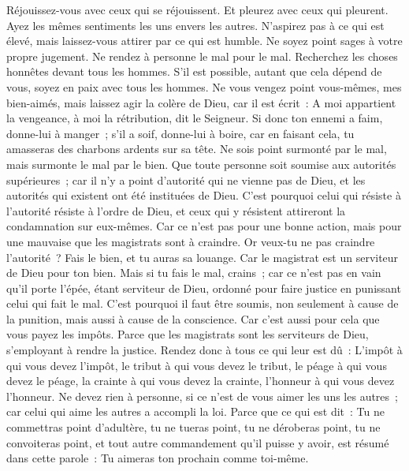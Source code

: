\begin{multicols}{2}
Réjouissez-vous avec ceux qui se réjouissent. Et pleurez avec ceux qui pleurent.
Ayez les mêmes sentiments les uns envers les autres. N'aspirez pas à ce qui est élevé, mais laissez-vous attirer par ce qui est humble. Ne soyez point sages à votre propre jugement.
Ne rendez à personne le mal pour le mal. Recherchez les choses honnêtes devant tous les hommes.
S'il est possible, autant que cela dépend de vous, soyez en paix avec tous les hommes.
Ne vous vengez point vous-mêmes, mes bien-aimés, mais laissez agir la colère de Dieu, car il est écrit~: A moi appartient la vengeance, à moi la rétribution, dit le Seigneur.
Si donc ton ennemi a faim, donne-lui à manger~; s'il a soif, donne-lui à boire, car en faisant cela, tu amasseras des charbons ardents sur sa tête.
Ne sois point surmonté par le mal, mais surmonte le mal par le bien.
\VerseOne{}Que toute personne soit soumise aux autorités supérieures~; car il n'y a point d'autorité qui ne vienne pas de Dieu, et les autorités qui existent ont été instituées de Dieu.
C'est pourquoi celui qui résiste à l'autorité résiste à l'ordre de Dieu, et ceux qui y résistent attireront la condamnation sur eux-mêmes.
Car ce n'est pas pour une bonne action, mais pour une mauvaise que les magistrats sont à craindre. Or veux-tu ne pas craindre l'autorité~? Fais le bien, et tu auras sa louange.
Car le magistrat est un serviteur de Dieu pour ton bien. Mais si tu fais le mal, crains~; car ce n'est pas en vain qu'il porte l'épée, étant serviteur de Dieu, ordonné pour faire justice en punissant celui qui fait le mal.
C'est pourquoi il faut être soumis, non seulement à cause de la punition, mais aussi à cause de la conscience.
Car c'est aussi pour cela que vous payez les impôts. Parce que les magistrats sont les serviteurs de Dieu, s'employant à rendre la justice.
Rendez donc à tous ce qui leur est dû~: L'impôt à qui vous devez l'impôt, le tribut à qui vous devez le tribut, le péage à qui vous devez le péage, la crainte à qui vous devez la crainte, l'honneur à qui vous devez l'honneur.
Ne devez rien à personne, si ce n'est de vous aimer les uns les autres~; car celui qui aime les autres a accompli la loi.
Parce que ce qui est dit~: Tu ne commettras point d'adultère, tu ne tueras point, tu ne déroberas point, tu ne convoiteras point, et tout autre commandement qu'il puisse y avoir, est résumé dans cette parole~: Tu aimeras ton prochain comme toi-même.

\end{multicols}
